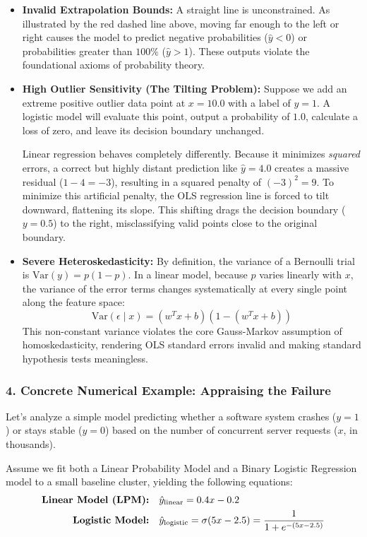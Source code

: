 \documentclass{article}
\begin{document}
\begin{itemize}
    \item \textbf{Invalid Extrapolation Bounds:} A straight line is unconstrained. As illustrated by the red dashed line above, moving far enough to the left or right causes the model to predict negative probabilities ($\hat{y} < 0$) or probabilities greater than $100\%$ ($\hat{y} > 1$). These outputs violate the foundational axioms of probability theory.
    \item \textbf{High Outlier Sensitivity (The Tilting Problem):} Suppose we add an extreme positive outlier data point at $x = 10.0$ with a label of $y = 1$. A logistic model will evaluate this point, output a probability of $1.0$, calculate a loss of zero, and leave its decision boundary unchanged. 
    
    Linear regression behaves completely differently. Because it minimizes \textit{squared} errors, a correct but highly distant prediction like $\hat{y} = 4.0$ creates a massive residual ($1 - 4 = -3$), resulting in a squared penalty of $(-3)^2 = 9$. To minimize this artificial penalty, the OLS regression line is forced to tilt downward, flattening its slope. This shifting drags the decision boundary ($y=0.5$) to the right, misclassifying valid points close to the original boundary.
    \item \textbf{Severe Heteroskedasticity:} By definition, the variance of a Bernoulli trial is $\text{Var}(y) = p(1-p)$. In a linear model, because $p$ varies linearly with $x$, the variance of the error terms changes systematically at every single point along the feature space:
    \begin{equation}
        \text{Var}(\epsilon \mid x) = (w^T x + b)(1 - (w^T x + b))
    \end{equation}
    This non-constant variance violates the core Gauss-Markov assumption of homoskedasticity, rendering OLS standard errors invalid and making standard hypothesis tests meaningless.
\end{itemize}

\subsubsection*{4. Concrete Numerical Example: Appraising the Failure}
Let's analyze a simple model predicting whether a software system crashes ($y=1$) or stays stable ($y=0$) based on the number of concurrent server requests ($x$, in thousands). 

Assume we fit both a Linear Probability Model and a Binary Logistic Regression model to a small baseline cluster, yielding the following equations:
\begin{align}
    \text{\textbf{Linear Model (LPM):}} \quad &\hat{y}_{\text{linear}} = 0.4x - 0.2 \\
    \text{\textbf{Logistic Model:}} \quad &\hat{y}_{\text{logistic}} = \sigma(5x - 2.5) = \frac{1}{1 + e^{-(5x - 2.5)}}
\end{align}
\end{document}
